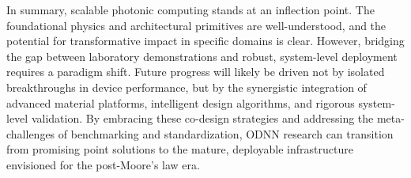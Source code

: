 In summary, scalable photonic computing stands at an inflection point. The foundational physics and architectural primitives are well-understood, and the potential for transformative impact in specific domains is clear. However, bridging the gap between laboratory demonstrations and robust, system-level deployment requires a paradigm shift. Future progress will likely be driven not by isolated breakthroughs in device performance, but by the synergistic integration of advanced material platforms, intelligent design algorithms, and rigorous system-level validation. By embracing these co-design strategies and addressing the meta-challenges of benchmarking and standardization, ODNN research can transition from promising point solutions to the mature, deployable infrastructure envisioned for the post-Moore's law era.
